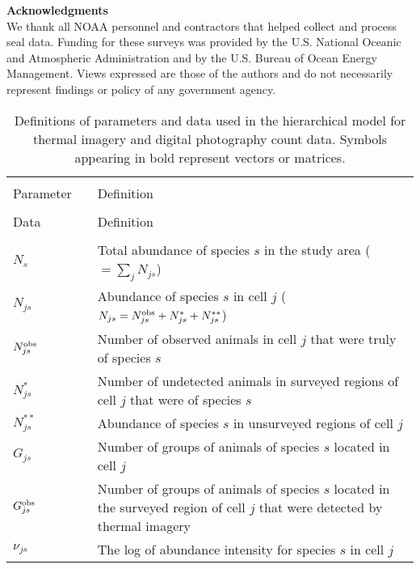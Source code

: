 \documentclass[12pt,fleqn]{article}
\begin{document}
\begin{flushleft}
\vspace{.3in}
{\bf Acknowledgments} \\
\vspace{.15in}
We thank all NOAA personnel and contractors that helped collect and process seal data.  Funding for these surveys was provided
by the U.S. National Oceanic and Atmospheric Administration and by the U.S. Bureau of Ocean Energy Management.
Views expressed are those of the authors and do not necessarily represent findings or policy of any government agency.





\pagebreak


\begin{longtable}{p{1.5cm}l p{14cm}}
\caption[Definitions of parameters and data]{Definitions of parameters and data used in the hierarchical model for thermal imagery and digital photography count data. Symbols appearing in bold represent vectors or matrices.}
\label{tab:defs} \\
\hline \hline \\
Parameter & & Definition \\
\cline{1-1} \cline{3-3}
\endfirsthead
\hline \hline \\
Data & & Definition \\
\cline{1-1} \cline{3-3}
\endhead
\hline
\endfoot
\hline
\endlastfoot
& & \\
$N_s$ & & Total abundance of species $s$ in the study area ($=\sum_j N_{js}$)\\
$N_{js}$ & & Abundance of species $s$ in cell $j$ ($N_{js}=N_{js}^{\rm obs}+N_{js}^*+N_{js}^{**}$)\\
$N_{js}^{\rm obs}$ & & Number of observed animals in cell $j$ that were truly of species $s$  \\
$N_{js}^*$ & & Number of undetected animals in surveyed regions of cell $j$ that were of species $s$ \\
$N_{js}^{**}$ & & Abundance of species $s$ in unsurveyed regions of cell $j$ \\
$G_{js}$   & & Number of groups of animals of species $s$ located in cell $j$\\
$G_{js}^{\rm obs}$ & & Number of groups of animals of species $s$ located in the surveyed region of cell $j$ that were detected by thermal imagery\\
$\nu_{js}$ & & The log of abundance intensity for species $s$ in cell $j$\\

\end{longtable}
\end{flushleft}
\end{document}
